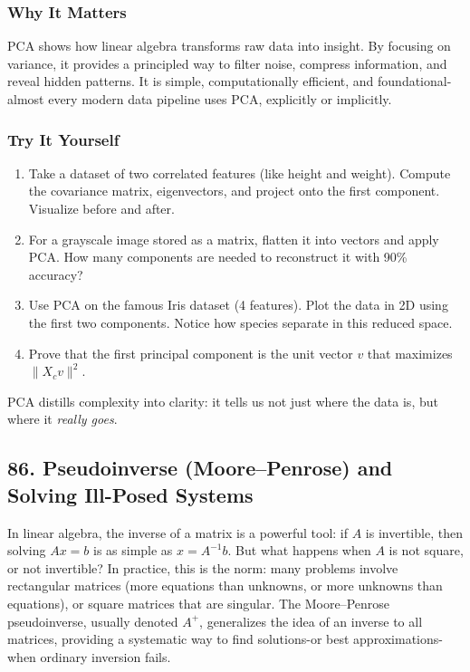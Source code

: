\documentclass[
  letterpaper,
  DIV=11,
  numbers=noendperiod]{scrreprt}
\providecommand{\tightlist}{%
  \setlength{\itemsep}{0pt}\setlength{\parskip}{0pt}}
\begin{document}
\subsubsection{Why It Matters}\label{why-it-matters-81}

PCA shows how linear algebra transforms raw data into insight. By
focusing on variance, it provides a principled way to filter noise,
compress information, and reveal hidden patterns. It is simple,
computationally efficient, and foundational-almost every modern data
pipeline uses PCA, explicitly or implicitly.

\subsubsection{Try It Yourself}\label{try-it-yourself-84}

\begin{enumerate}
\def\labelenumi{\arabic{enumi}.}
\tightlist
\item
  Take a dataset of two correlated features (like height and weight).
  Compute the covariance matrix, eigenvectors, and project onto the
  first component. Visualize before and after.
\item
  For a grayscale image stored as a matrix, flatten it into vectors and
  apply PCA. How many components are needed to reconstruct it with 90\%
  accuracy?
\item
  Use PCA on the famous Iris dataset (4 features). Plot the data in 2D
  using the first two components. Notice how species separate in this
  reduced space.
\item
  Prove that the first principal component is the unit vector \(v\) that
  maximizes \(\|X_c v\|^2\).
\end{enumerate}

PCA distills complexity into clarity: it tells us not just where the
data is, but where it \emph{really goes}.

\subsection{86. Pseudoinverse (Moore--Penrose) and Solving Ill-Posed
Systems}\label{pseudoinverse-moorepenrose-and-solving-ill-posed-systems}

In linear algebra, the inverse of a matrix is a powerful tool: if \(A\)
is invertible, then solving \(Ax = b\) is as simple as \(x = A^{-1}b\).
But what happens when \(A\) is not square, or not invertible? In
practice, this is the norm: many problems involve rectangular matrices
(more equations than unknowns, or more unknowns than equations), or
square matrices that are singular. The Moore--Penrose pseudoinverse,
usually denoted \(A^+\), generalizes the idea of an inverse to all
matrices, providing a systematic way to find solutions-or best
approximations-when ordinary inversion fails.
\end{document}
